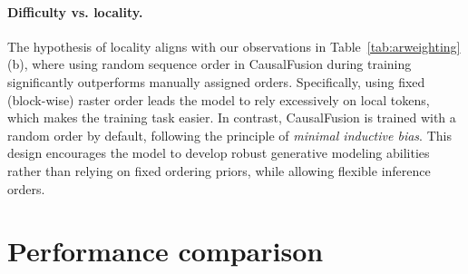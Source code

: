 \vspace{-5pt}
\paragraph{Difficulty vs. locality.} The hypothesis of {locality} aligns with our observations in Table~\ref{tab:arweighting}(b), where using random sequence order in CausalFusion during training significantly outperforms manually assigned orders. Specifically, using fixed (block-wise) raster order leads the model to rely excessively on local tokens, which makes the training task easier. In contrast, CausalFusion is trained with a random order by default, following the principle of \textit{minimal inductive bias}. This design encourages the model to develop robust generative modeling abilities rather than relying on fixed ordering priors, while allowing flexible inference orders.

\section{Performance comparison}\label{sec:sota_exp}


